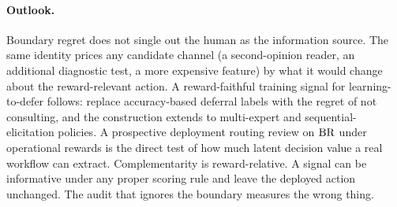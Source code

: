\paragraph{Outlook.}
Boundary regret does not single out the human as the information source.
The same identity prices any candidate channel (a second-opinion reader, an additional diagnostic test, a more expensive feature) by what it would change about the reward-relevant action.
A reward-faithful training signal for learning-to-defer follows: replace accuracy-based deferral labels with the regret of not consulting, and the construction extends to multi-expert and sequential-elicitation policies.
A prospective deployment routing review on $\operatorname{BR}$ under operational rewards is the direct test of how much latent decision value a real workflow can extract.
Complementarity is reward-relative. A signal can be informative under any proper scoring rule and leave the deployed action unchanged. The audit that ignores the boundary measures the wrong thing.


